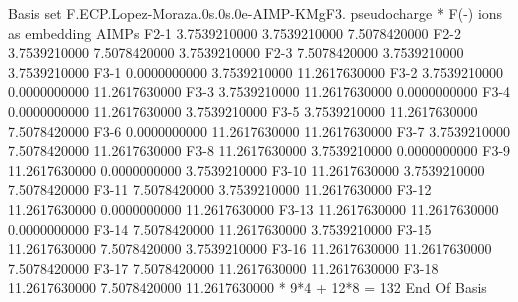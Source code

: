 \begin{inputlisting}
Basis set
F.ECP.Lopez-Moraza.0s.0s.0e-AIMP-KMgF3. 
pseudocharge
* F(-) ions as embedding AIMPs 
F2-1    3.7539210000   3.7539210000   7.5078420000
F2-2    3.7539210000   7.5078420000   3.7539210000
F2-3    7.5078420000   3.7539210000   3.7539210000
F3-1    0.0000000000   3.7539210000  11.2617630000
F3-2    3.7539210000   0.0000000000  11.2617630000
F3-3    3.7539210000  11.2617630000   0.0000000000
F3-4    0.0000000000  11.2617630000   3.7539210000
F3-5    3.7539210000  11.2617630000   7.5078420000
F3-6    0.0000000000  11.2617630000  11.2617630000
F3-7    3.7539210000   7.5078420000  11.2617630000
F3-8   11.2617630000   3.7539210000   0.0000000000
F3-9   11.2617630000   0.0000000000   3.7539210000
F3-10   11.2617630000   3.7539210000   7.5078420000
F3-11    7.5078420000   3.7539210000  11.2617630000
F3-12   11.2617630000   0.0000000000  11.2617630000
F3-13   11.2617630000  11.2617630000   0.0000000000
F3-14    7.5078420000  11.2617630000   3.7539210000
F3-15   11.2617630000   7.5078420000   3.7539210000
F3-16   11.2617630000  11.2617630000   7.5078420000
F3-17    7.5078420000  11.2617630000  11.2617630000
F3-18   11.2617630000   7.5078420000  11.2617630000
* 9*4 +  12*8 = 132
End Of Basis


\end{inputlisting}
